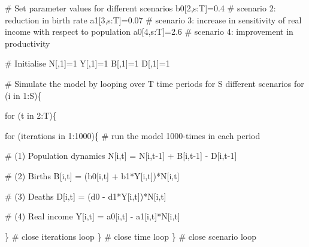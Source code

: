 \documentclass[
  letterpaper,
  DIV=11,
  numbers=noendperiod]{scrreprt}
\newenvironment{Shaded}{\begin{snugshade}}{\end{snugshade}}
\newcommand{\CommentTok}[1]{\textcolor[rgb]{0.37,0.37,0.37}{#1}}
\newcommand{\ControlFlowTok}[1]{\textcolor[rgb]{0.00,0.23,0.31}{#1}}
\newcommand{\DecValTok}[1]{\textcolor[rgb]{0.68,0.00,0.00}{#1}}
\newcommand{\FloatTok}[1]{\textcolor[rgb]{0.68,0.00,0.00}{#1}}
\newcommand{\NormalTok}[1]{\textcolor[rgb]{0.00,0.23,0.31}{#1}}
\newcommand{\OtherTok}[1]{\textcolor[rgb]{0.00,0.23,0.31}{#1}}
\newcommand{\SpecialCharTok}[1]{\textcolor[rgb]{0.37,0.37,0.37}{#1}}
\begin{document}
\begin{Shaded}
\begin{Highlighting}[]
\CommentTok{\# Set parameter values for different scenarios}
\NormalTok{b0[}\DecValTok{2}\NormalTok{,s}\SpecialCharTok{:}\NormalTok{T]}\OtherTok{=}\FloatTok{0.4}  \CommentTok{\# scenario 2: reduction in birth rate}
\NormalTok{a1[}\DecValTok{3}\NormalTok{,s}\SpecialCharTok{:}\NormalTok{T]}\OtherTok{=}\FloatTok{0.07} \CommentTok{\# scenario 3: increase in sensitivity of real income with respect to population}
\NormalTok{a0[}\DecValTok{4}\NormalTok{,s}\SpecialCharTok{:}\NormalTok{T]}\OtherTok{=}\FloatTok{2.6}  \CommentTok{\# scenario 4: improvement in productivity}

\CommentTok{\# Initialise }
\NormalTok{N[,}\DecValTok{1}\NormalTok{]}\OtherTok{=}\DecValTok{1}
\NormalTok{Y[,}\DecValTok{1}\NormalTok{]}\OtherTok{=}\DecValTok{1}
\NormalTok{B[,}\DecValTok{1}\NormalTok{]}\OtherTok{=}\DecValTok{1}
\NormalTok{D[,}\DecValTok{1}\NormalTok{]}\OtherTok{=}\DecValTok{1}

\CommentTok{\# Simulate the model by looping over T time periods for S different scenarios}
\ControlFlowTok{for}\NormalTok{ (i }\ControlFlowTok{in} \DecValTok{1}\SpecialCharTok{:}\NormalTok{S)\{  }

  \ControlFlowTok{for}\NormalTok{ (t }\ControlFlowTok{in} \DecValTok{2}\SpecialCharTok{:}\NormalTok{T)\{}
 
    \ControlFlowTok{for}\NormalTok{ (iterations }\ControlFlowTok{in} \DecValTok{1}\SpecialCharTok{:}\DecValTok{1000}\NormalTok{)\{ }\CommentTok{\# run the model 1000{-}times in each period }
       
      \CommentTok{\# (1) Population dynamics    }
\NormalTok{      N[i,t] }\OtherTok{=}\NormalTok{ N[i,t}\DecValTok{{-}1}\NormalTok{] }\SpecialCharTok{+}\NormalTok{ B[i,t}\DecValTok{{-}1}\NormalTok{] }\SpecialCharTok{{-}}\NormalTok{ D[i,t}\DecValTok{{-}1}\NormalTok{]}
      
      \CommentTok{\# (2) Births}
\NormalTok{      B[i,t] }\OtherTok{=}\NormalTok{ (b0[i,t] }\SpecialCharTok{+}\NormalTok{ b1}\SpecialCharTok{*}\NormalTok{Y[i,t])}\SpecialCharTok{*}\NormalTok{N[i,t]}
      
      \CommentTok{\# (3) Deaths}
\NormalTok{      D[i,t] }\OtherTok{=}\NormalTok{ (d0 }\SpecialCharTok{{-}}\NormalTok{ d1}\SpecialCharTok{*}\NormalTok{Y[i,t])}\SpecialCharTok{*}\NormalTok{N[i,t]  }
      
      \CommentTok{\# (4) Real income}
\NormalTok{      Y[i,t] }\OtherTok{=}\NormalTok{ a0[i,t] }\SpecialCharTok{{-}}\NormalTok{ a1[i,t]}\SpecialCharTok{*}\NormalTok{N[i,t]   }
      
\NormalTok{    \}  }\CommentTok{\# close iterations loop }
\NormalTok{  \}    }\CommentTok{\# close time loop}
\NormalTok{\}      }\CommentTok{\# close scenario loop}
\end{Highlighting}
\end{Shaded}
\end{document}
